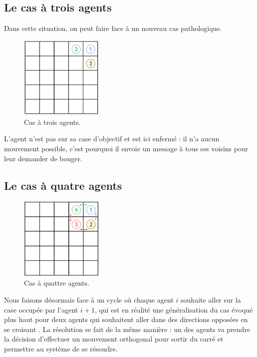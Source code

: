 \documentclass[a4paper, 12pt,twocolumn, french]{article}
\newcommand*\circled[1]{
	\tikz[baseline=(char.base)]{
		\node[shape=circle,draw,inner sep=2pt] (char) {#1};
	}
}
\begin{document}
\subsection{Le cas à trois agents}

Dans cette situation, on peut faire face à un nouveau cas pathologique.

\begin{figure}[h]
	\centering
	\includegraphics[width=150px]{images/3_agents.png}
	\caption{Cas à trois agents.}
\end{figure}

L’agent \circled{1} n'est pas sur sa case d'objectif et est ici \og{} enfermé \fg{} : il n'a aucun mouvement possible, c'est pourquoi il envoie un message à tous ses voisins pour leur demander de bouger.

\subsection{Le cas à quatre agents}

\begin{figure}[h]
	\centering
	\includegraphics[width=150px]{images/4_agents.png}
	\caption{Cas à quattre agents.}
\end{figure}

Nous faisons désormais face à un cycle où chaque agent $i$ souhaite aller sur la case occupée par l'agent $i + 1$, qui est en réalité une généralisation du cas évoqué plus haut pour deux agents qui souhaitent aller dans des directions opposées en se \og{} croisant \fg{}. La résolution se fait de la même manière : un des agents va prendre la décision d'effectuer un mouvement orthogonal pour \og{} sortir du carré \fg{} et permettre au système de se résoudre.
\end{document}
